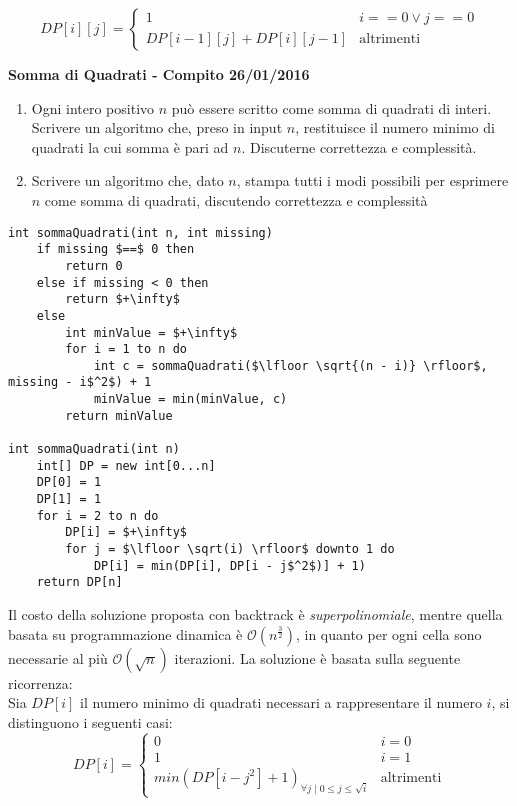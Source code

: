 \documentclass[../cheatSheetAlgoritmi.tex]{subfiles}
\begin{document}
\begin{equation*}
    DP[i][j]=\begin{cases}
        1 & \text{$i == 0 \lor j == 0$}\\
        DP[i-1][j] + DP[i][j-1] & \text{altrimenti} 
    \end{cases}
\end{equation*}
\newpage
\begin{flushleft}
\textbf{Somma di Quadrati - Compito 26/01/2016}
\end{flushleft}
\begin{enumerate}
	\item Ogni intero positivo $n$ può essere scritto come somma di quadrati di interi. Scrivere un algoritmo che, preso in input $n$, restituisce il numero minimo di quadrati la cui somma è pari ad $n$. Discuterne correttezza e complessità.
	\item Scrivere un algoritmo che, dato $n$, stampa tutti i modi possibili per esprimere $n$ come somma di quadrati, discutendo correttezza e complessità
\end{enumerate}
\begin{lstlisting}[caption=Somma di Quadrati - Conteggio]
int sommaQuadrati(int n, int missing)
    if missing $==$ 0 then
        return 0
    else if missing < 0 then
        return $+\infty$
    else
        int minValue = $+\infty$
        for i = 1 to n do 
            int c = sommaQuadrati($\lfloor \sqrt{(n - i)} \rfloor$, missing - i$^2$) + 1
            minValue = min(minValue, c)
        return minValue

int sommaQuadrati(int n)
    int[] DP = new int[0...n]
    DP[0] = 1
    DP[1] = 1
    for i = 2 to n do
        DP[i] = $+\infty$
        for j = $\lfloor \sqrt(i) \rfloor$ downto 1 do
            DP[i] = min(DP[i], DP[i - j$^2$)] + 1)
    return DP[n]
\end{lstlisting}
Il costo della soluzione proposta con backtrack è \emph{superpolinomiale}, mentre quella basata su programmazione dinamica è $\mathcal{O}(n^\frac{3}{2})$, in quanto per ogni cella sono necessarie al più $\mathcal{O}(\sqrt n)$ iterazioni. La soluzione è basata sulla seguente ricorrenza: \\
Sia $DP[i]$ il numero minimo di quadrati necessari a rappresentare il numero $i$, si distinguono i seguenti casi:
\begin{equation*}
    DP[i]=\begin{cases}
        0 & \text{$i = 0$}\\
        1 & \text{$i = 1$}\\
        min(DP[i - j^2] + 1)_{\forall j \mid 0 \leq j \leq \sqrt i} & \text{altrimenti} 
    \end{cases}
\end{equation*}
\end{document}
